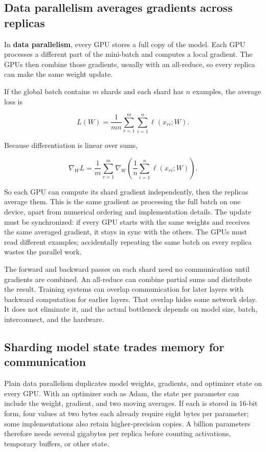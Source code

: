 \subsection{Data parallelism averages gradients across replicas}\label{04-visual-computing-ii-ch031-data-parallelism-averages-gradients-across-replicas}

In \textbf{data parallelism}, every GPU stores a full copy of the model. Each GPU processes a different part of the mini-batch and computes a local gradient. The GPUs then combine those gradients, usually with an all-reduce, so every replica can make the same weight update.

If the global batch contains \(m\) shards and each shard has \(n\) examples, the average loss is

\[
L(W)=\frac{1}{mn}\sum_{r=1}^{m}\sum_{i=1}^{n}\ell(x_{ri};W).
\]

Because differentiation is linear over sums,

\[
\nabla_W L=\frac{1}{m}\sum_{r=1}^{m}\nabla_W\left(\frac{1}{n}\sum_{i=1}^{n}\ell(x_{ri};W)\right).
\]

So each GPU can compute its shard gradient independently, then the replicas average them. This is the same gradient as processing the full batch on one device, apart from numerical ordering and implementation details. The update must be synchronized: if every GPU starts with the same weights and receives the same averaged gradient, it stays in sync with the others. The GPUs must read different examples; accidentally repeating the same batch on every replica wastes the parallel work.

The forward and backward passes on each shard need no communication until gradients are combined. An all-reduce can combine partial sums and distribute the result. Training systems can overlap communication for later layers with backward computation for earlier layers. That overlap hides some network delay. It does not eliminate it, and the actual bottleneck depends on model size, batch, interconnect, and the hardware.

\subsection{Sharding model state trades memory for communication}\label{04-visual-computing-ii-ch031-sharding-model-state-trades-memory-for-communication}

Plain data parallelism duplicates model weights, gradients, and optimizer state on every GPU. With an optimizer such as Adam, the state per parameter can include the weight, gradient, and two moving averages. If each is stored in 16-bit form, four values at two bytes each already require eight bytes per parameter; some implementations also retain higher-precision copies. A billion parameters therefore needs several gigabytes per replica before counting activations, temporary buffers, or other state.

